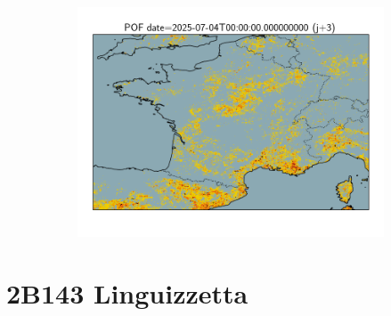 \documentclass{article}
\begin{document}
\begin{figure}[H]
    \begin{subfigure}[b]{0.32\textwidth}
        \centering
        \includegraphics[width=\linewidth]{general_pof_j3.png} %
    \end{subfigure}
\end{figure}



\vspace{-1em}
\section*{2B143 Linguizzetta}
\vspace{-1em}
\end{document}
